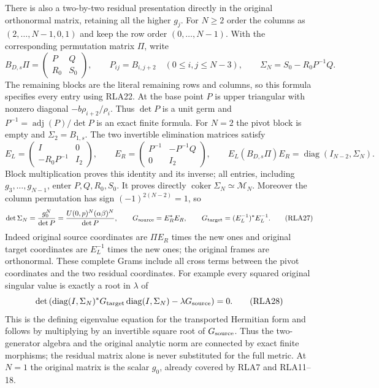 \documentclass[11pt]{article}
\newcommand{\R}{\mathbb R}
\begin{document}
There is also a two-by-two residual presentation directly in the
original orthonormal matrix, retaining all the higher $g_j$.
For $N\ge2$ order the columns as $(2,\ldots,N-1,0,1)$ and keep
the row order $(0,\ldots,N-1)$.  With the corresponding permutation
matrix $\Pi$, write
\[
 B_{D,s}\Pi=\begin{pmatrix}P&Q\\R_0&S_0\end{pmatrix},\qquad
 P_{ij}=B_{i,j+2}\quad(0\le i,j\le N-3),\qquad
 \Sigma_N=S_0-R_0P^{-1}Q.
 \tag{RLA25}
\]
The remaining blocks are the literal remaining rows and columns,
so this formula specifies every entry using RLA22.
At the base point $P$ is upper triangular with nonzero diagonal
$-b\rho_{i+2}/\rho_i$.  Thus $\det P$ is a unit germ and
$P^{-1}=\operatorname{adj}(P)/\det P$ is an exact finite formula.
For $N=2$ the pivot block is empty and $\Sigma_2=B_{1,s}$.
The two invertible elimination matrices satisfy
\[
 E_L=\begin{pmatrix}I&0\\-R_0P^{-1}&I_2\end{pmatrix},\qquad
 E_R=\begin{pmatrix}P^{-1}&-P^{-1}Q\\0&I_2\end{pmatrix},\qquad
 E_L(B_{D,s}\Pi)E_R=\operatorname{diag}(I_{N-2},\Sigma_N).
 \tag{RLA26}
\]
Block multiplication proves this identity and its inverse; all
entries, including $g_3,\ldots,g_{N-1}$, enter $P,Q,R_0,S_0$.
It proves directly $\operatorname{coker}\Sigma_N\simeq\mathcal M_N$.
Moreover the column permutation has sign $(-1)^{2(N-2)}=1$, so
\[
 \det\Sigma_N=\frac{g_0^N}{\det P}
       =\frac{U(0,p)^N(\alpha\beta)^N}{\det P},\qquad
 G_{\rm source}=E_R^*E_R,\qquad
 G_{\rm target}=(E_L^{-1})^*E_L^{-1}.
 \tag{RLA27}
\]
Indeed original source coordinates are $\Pi E_R$ times the new
ones and original target coordinates are $E_L^{-1}$ times the
new ones; the original frames are orthonormal.
These complete Grams include all cross terms between the pivot
coordinates and the two residual coordinates.
For example every squared original singular value is exactly a
root in $\lambda$ of
\[
 \det\left(
 \operatorname{diag}(I,\Sigma_N)^*G_{\rm target}
 \operatorname{diag}(I,\Sigma_N)-\lambda G_{\rm source}\right)=0.
 \tag{RLA28}
\]
This is the defining eigenvalue equation for the transported
Hermitian form and follows by multiplying by an invertible square
root of $G_{\rm source}$.  Thus the two-generator algebra and the
original analytic norm are connected by exact finite morphisms;
the residual matrix alone is never substituted for the full metric.
At $N=1$ the original matrix is the scalar $g_0$, already covered
by RLA7 and RLA11--18.
\end{document}
